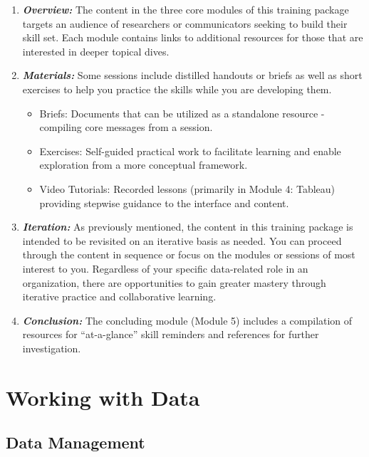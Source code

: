 \documentclass[
]{book}
\providecommand{\tightlist}{%
  \setlength{\itemsep}{0pt}\setlength{\parskip}{0pt}}
\begin{document}
\begin{enumerate}
\def\labelenumi{\arabic{enumi}.}
\item
  \textbf{\emph{Overview:}} The content in the three core modules of this training package targets an audience of researchers or communicators seeking to build their skill set. Each module contains links to additional resources for those that are interested in deeper topical dives.
\item
  \textbf{\emph{Materials:}} Some sessions include distilled handouts or briefs as well as short exercises to help you practice the skills while you are developing them.

  \begin{itemize}
  \tightlist
  \item
    Briefs: Documents that can be utilized as a standalone resource - compiling core messages from a session.
  \item
    Exercises: Self-guided practical work to facilitate learning and enable exploration from a more conceptual framework.
  \item
    Video Tutorials: Recorded lessons (primarily in Module 4: Tableau) providing stepwise guidance to the interface and content.
  \end{itemize}
\item
  \textbf{\emph{Iteration:}} As previously mentioned, the content in this training package is intended to be revisited on an iterative basis as needed. You can proceed through the content in sequence or focus on the modules or sessions of most interest to you. Regardless of your specific data-related role in an organization, there are opportunities to gain greater mastery through iterative practice and collaborative learning.
\item
  \textbf{\emph{Conclusion:}} The concluding module (Module 5) includes a compilation of resources for ``at-a-glance'' skill reminders and references for further investigation.
\end{enumerate}

\hypertarget{working-with-data}{%
\chapter{Working with Data}\label{working-with-data}}

\hypertarget{data-management}{%
\section{Data Management}\label{data-management}}
\end{document}
